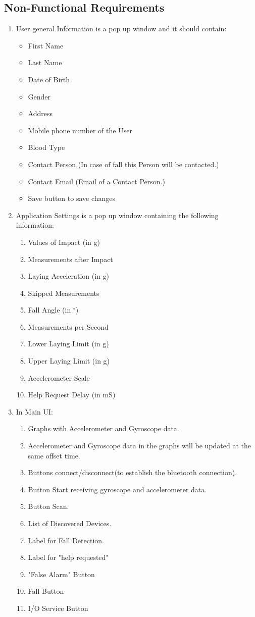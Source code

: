\documentclass[hidelinks,conference,12pt]{IEEETran}
\begin{document}
\subsection{Non-Functional Requirements}
\begin{enumerate}
	\item User general Information is a pop up window and it should contain:
	\begin{itemize}
		\item First Name
		\item Last Name
		\item Date of Birth
		\item Gender
		\item Address
		\item Mobile phone number of the User
		\item Blood Type
		\item Contact Person (In case of fall this Person will be contacted.)
		\item Contact Email (Email of a Contact Person.)
		\item Save button to save changes
	\end{itemize}
	\item Application Settings is a pop up window containing the following information:
	\begin{enumerate}
		\item Values of Impact (in g)
		\item Measurements after Impact
		\item Laying Acceleration (in g)
		\item Skipped Measurements
		\item Fall Angle (in $^{\circ}$)
		\item Measurements per Second
		\item Lower Laying Limit (in g)
		\item Upper Laying Limit (in g)
		\item Accelerometer Scale
		\item Help Request Delay (in mS)
	\end{enumerate}
	\item In Main UI:
	\begin{enumerate}
		\item Graphs with Accelerometer and Gyroscope data.
		\item Accelerometer and Gyroscope data in the graphs will be updated at the same offset time.
		\item Buttons connect/disconnect(to establish the bluetooth connection).
		\item Button Start receiving gyroscope and accelerometer data.
		\item Button Scan.
		\item List of Discovered Devices.
		\item Label for Fall Detection.
		\item Label for "help requested"
		\item "False Alarm" Button
		\item Fall Button
		\item I/O Service Button
	\end{enumerate}
\end{enumerate}
\end{document}
